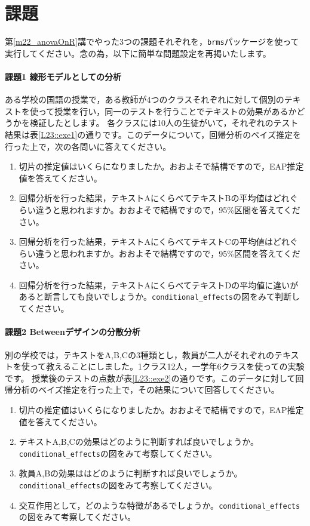 \documentclass{ltjbook}
\begin{document}
\section{課題}
第\ref{m22_anovaOnR}講でやった3つの課題それぞれを，\texttt{brms}パッケージを使って実行してください。念の為，以下に簡単な問題設定を再掲いたします。
\paragraph{課題1 線形モデルとしての分析}
ある学校の国語の授業で，ある教師が4つのクラスそれぞれに対して個別のテキストを使って授業を行い，同一のテストを行うことでテキストの効果があるかどうかを検証したとします。
各クラスには10人の生徒がいて，それぞれのテスト結果は表\ref{L23::exe1}の通りです。このデータについて，回帰分析のベイズ推定を行った上で，次の各問いに答えてください。

\begin{enumerate}
	\item 切片の推定値はいくらになりましたか。おおよそで結構ですので，EAP推定値を答えてください。
	\item 回帰分析を行った結果，テキストAにくらべてテキストBの平均値はどれぐらい違うと思われますか。おおよそで結構ですので，95\%区間を答えてください。
	\item 回帰分析を行った結果，テキストAにくらべてテキストCの平均値はどれぐらい違うと思われますか。おおよそで結構ですので，95\%区間を答えてください。
	\item 回帰分析を行った結果，テキストAにくらべてテキストDの平均値に違いがあると断言しても良いでしょうか。\verb|conditional_effects|の図をみて判断してください。
\end{enumerate}


\paragraph{課題2 Betweenデザインの分散分析}
別の学校では，テキストをA,B,Cの3種類とし，教員が二人がそれぞれのテキストを使って教えることにしました。1クラス12人，一学年6クラスを使っての実験です。
授業後のテストの点数が表\ref{L23::exe2}の通りです。このデータに対して回帰分析のベイズ推定を行った上で，その結果について回答してください。

\begin{enumerate}
	\item 切片の推定値はいくらになりましたか。おおよそで結構ですので，EAP推定値を答えてください。
	\item テキストA,B,Cの効果はどのように判断すれば良いでしょうか。\verb|conditional_effects|の図をみて考察してください。
	\item 教員A,Bの効果ははどのように判断すれば良いでしょうか。\verb|conditional_effects|の図をみて考察してください。
	\item 交互作用として，どのような特徴があるでしょうか。\verb|conditional_effects|の図をみて考察してください。
\end{enumerate}
\end{document}
